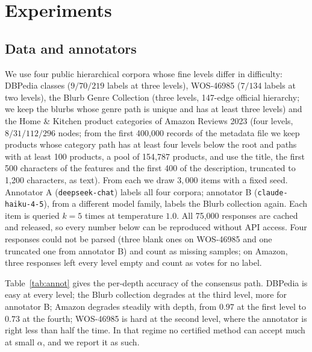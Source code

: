 \documentclass[preprint,12pt]{elsarticle}
\theoremstyle{definition}
\theoremstyle{remark}
\begin{document}
\section{Experiments}
\label{sec:exp}

\subsection{Data and annotators}
\label{sec:exp-data}

We use four public hierarchical corpora whose fine levels differ in difficulty:
DBPedia classes ($9/70/219$ labels at three levels), WOS-46985 ($7/134$ labels at
two levels), the Blurb Genre Collection (three levels, 147-edge official
hierarchy; we keep the blurbs whose genre path is unique and has at least three
levels) and the Home \& Kitchen product categories of Amazon Reviews 2023
\cite{hou2024amazon} (four levels, $8/31/112/296$ nodes; from the first 400,000
records of the metadata file we keep products whose category path has at least
four levels below the root and paths with at least 100 products, a pool of
154,787 products, and use the title, the first 500 characters of the features
and the first 400 of the description, truncated to 1,200 characters, as text). From each we draw $3{,}000$ items with a fixed seed.
Annotator A (\texttt{deepseek-chat}) labels all four corpora; annotator B
(\texttt{claude-haiku-4-5}), from a different model family, labels the Blurb
collection again. Each item is queried $k=5$ times at temperature $1.0$. All
75,000 responses are cached and released, so every number below can be
reproduced without API access. Four responses could not be parsed (three
blank ones on WOS-46985 and one truncated one from annotator B) and count as
missing samples; on Amazon, three responses left every level empty and count
as votes for no label.

Table~\ref{tab:annot} gives the per-depth accuracy of the consensus path.
DBPedia is easy at every level; the Blurb collection degrades at the third
level, more for annotator B; Amazon degrades steadily with depth, from
$0.97$ at the first level to $0.73$ at the fourth;
WOS-46985 is hard at the second level, where the
annotator is right less than half the time. In that regime no certified method
can accept much at small $\alpha$, and we report it as such.

\begin{table}[t]
\centering
\caption{Accuracy of the consensus path by depth.}
\label{tab:annot}

\end{table}
\end{document}
